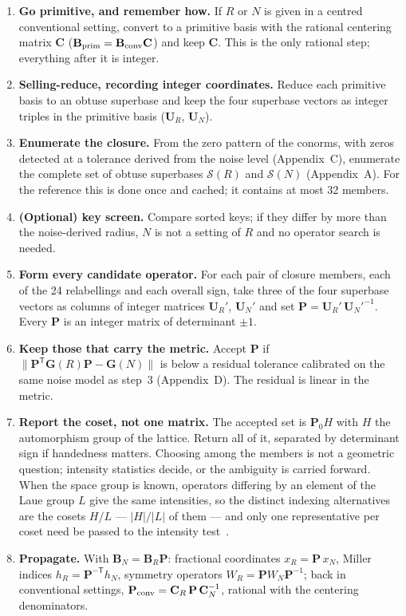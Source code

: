 \documentclass[11pt]{article}
\newcommand{\Gmet}{\mathbf{G}}
\newcommand{\Pop}{\mathbf{P}}
\newcommand{\Uop}{\mathbf{U}}
\newcommand{\Bbasis}{\mathbf{B}}
\newcommand{\Sclosure}{\mathcal{S}}
\begin{document}
\begin{enumerate}
\item \textbf{Go primitive, and remember how.} If $R$ or $N$ is given in a centred conventional setting, convert to a primitive basis with the rational centering matrix $\mathbf C$ ($\Bbasis_{\rm prim}=\Bbasis_{\rm conv}\mathbf C$) and keep $\mathbf C$. This is the only rational step; everything after it is integer.
\item \textbf{Selling-reduce, recording integer coordinates.} Reduce each primitive basis to an obtuse superbase and keep the four superbase vectors as integer triples in the primitive basis ($\Uop_R$, $\Uop_N$).
\item \textbf{Enumerate the closure.} From the zero pattern of the conorms, with zeros detected at a tolerance derived from the noise level (Appendix~C), enumerate the complete set of obtuse superbases $\Sclosure(R)$ and $\Sclosure(N)$ (Appendix~A). For the reference this is done once and cached; it contains at most 32 members.
\item \textbf{(Optional) key screen.} Compare sorted keys; if they differ by more than the noise-derived radius, $N$ is not a setting of $R$ and no operator search is needed.
\item \textbf{Form every candidate operator.} For each pair of closure members, each of the 24 relabellings and each overall sign, take three of the four superbase vectors as columns of integer matrices $\Uop_R'$, $\Uop_N'$ and set $\Pop=\Uop_R'\,\Uop_N'^{-1}$. Every $\Pop$ is an integer matrix of determinant $\pm1$.
\item \textbf{Keep those that carry the metric.} Accept $\Pop$ if $\|\Pop^{\mathsf T}\Gmet(R)\Pop-\Gmet(N)\|$ is below a residual tolerance calibrated on the same noise model as step~3 (Appendix~D). The residual is linear in the metric.
\item \textbf{Report the coset, not one matrix.} The accepted set is $\Pop_0 H$ with $H$ the automorphism group of the lattice. Return all of it, separated by determinant sign if handedness matters. Choosing among the members is not a geometric question; intensity statistics decide, or the ambiguity is carried forward. When the space group is known, operators differing by an element of the Laue group $L$ give the same intensities, so the distinct indexing alternatives are the cosets $H/L$ --- $|H|/|L|$ of them --- and only one representative per coset need be passed to the intensity test~\cite{lvm2006}.
\item \textbf{Propagate.} With $\Bbasis_N=\Bbasis_R\Pop$: fractional coordinates $x_R=\Pop\,x_N$, Miller indices $h_R=\Pop^{-\mathsf T}h_N$, symmetry operators $W_R=\Pop W_N\Pop^{-1}$; back in conventional settings, $\Pop_{\rm conv}=\mathbf C_R\,\Pop\,\mathbf C_N^{-1}$, rational with the centering denominators.
\end{enumerate}
\end{document}
